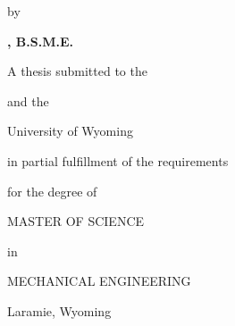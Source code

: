 \thispagestyle{plain}

\begin{center}

\vspace*{\baselineskip}
\large \MakeUppercase{\thesistitle}

\vspace{0.75in}

\footnotesize by

\vspace{0.75in}

\normalsize \textbf{\authorname, B.S.M.E.}

\vspace{0.75in}

\footnotesize
A thesis submitted to the \departmentname

and the

University of Wyoming

in partial fulfillment of the requirements

for the degree of

\vspace{\baselineskip}

\normalsize MASTER OF SCIENCE

\footnotesize in

\normalsize MECHANICAL ENGINEERING

\vspace*{\fill}

\footnotesize
Laramie, Wyoming

\graduationmonth    \graduationyear

\end{center}

\clearpage